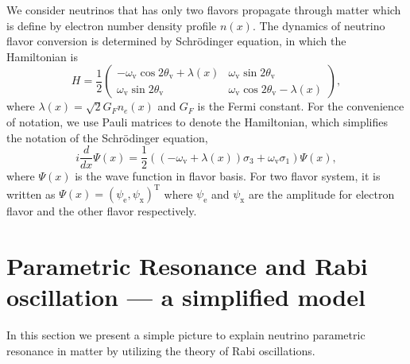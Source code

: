 \documentclass[%
reprint,
 amsmath,amssymb,
 aps,
]{revtex4-1}
\begin{document}
We consider neutrinos that has only two flavors propagate through matter which is define by electron number density profile $n(x)$. The dynamics of neutrino flavor conversion is determined by Schr\"{o}dinger equation, in which the Hamiltonian is
\begin{equation}
    H =  \frac{1}{2} \begin{pmatrix}
    -\omega_{\mathrm{v}} \cos 2\theta_{\mathrm{v}} + \lambda(x) & \omega_{\mathrm{v}}\sin 2\theta_{\mathrm{v}} \\
   \omega_{\mathrm{v}} \sin 2\theta_{\mathrm{v}} & \omega_{\mathrm{v}} \cos 2\theta_{\mathrm{v}} - \lambda(x)
    \end{pmatrix},
\end{equation}
where $\lambda(x)= \sqrt{2}G_F n_e(x)$ and $G_F$ is the Fermi constant. For the convenience of notation, we use Pauli matrices to denote the Hamiltonian, which simplifies the notation of the Schr\"{o}dinger equation,
\begin{equation}
    i\frac{d}{dx}\Psi(x) = \frac{1}{2} \left(  
    (- \omega_{\mathrm{v}} + \lambda(x) ) \sigma_3 + \omega_{\mathrm{v}} \sigma_1 
    \right)
    \Psi(x),
\end{equation}
where $\Psi(x)$ is the wave function in flavor basis. For two flavor system, it is written as $ \Psi(x) = \left(
    \psi_{\mathrm{e}} ,
    \psi_{\mathrm{x}}
    \right)^{\mathrm{T}}$ where $\psi_{\mathrm{e}}$ and $\psi_{\mathrm{x}}$ are the amplitude for electron flavor and the other flavor respectively.



\section{\label{sec:simple}Parametric Resonance and Rabi oscillation --- a simplified model}%


In this section we present a simple picture to explain neutrino parametric resonance in matter by utilizing the theory of Rabi oscillations.
\end{document}
